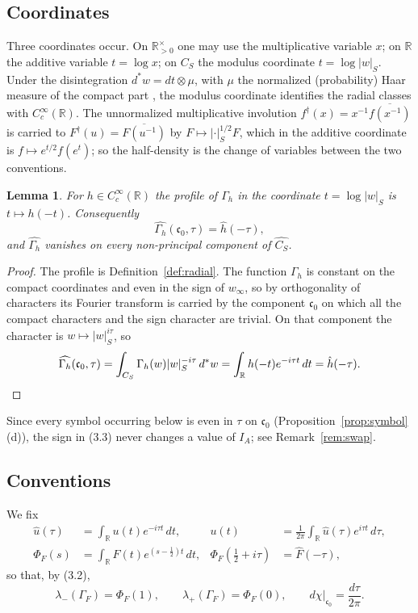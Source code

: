 \documentclass[11pt]{amsart}
\newtheorem{lemma}[theorem]{Lemma}
\theoremstyle{definition}
\theoremstyle{remark}
\newcommand{\R}{\mathbb R}
\newcommand{\CS}{C_S}
\newcommand{\cz}{\mathfrak c_0}
\begin{document}
\subsection{Coordinates}

Three coordinates occur.  On $\R_{>0}^\times$ one may use the multiplicative
variable $x$; on $\R$ the additive variable $t=\log x$; on $\CS$ the modulus
coordinate $t=\log|w|_S$.  Under the disintegration $d^*w=dt\otimes\mu$, with
$\mu$ the normalized (probability) Haar measure of the compact part
\cite[(10)]{P43}, the modulus coordinate identifies the
radial classes with $C_c^\infty(\R)$.  The unnormalized multiplicative
involution $f^\dagger(x)=x^{-1}\overline{f(x^{-1})}$ is carried to
$F^\dagger(u)=\overline{F(u^{-1})}$ by $F\mapsto|\cdot|_S^{1/2}F$, which in the
additive coordinate is $f\mapsto e^{t/2}f(e^t)$; so the half-density is the
change of variables between the two conventions.

\begin{lemma}
\label{lem:profile}
For $h\in C_c^\infty(\R)$ the profile of $\Gamma_h$ in the coordinate
$t=\log|w|_S$ is $t\mapsto h(-t)$.  Consequently
\[
  \widehat{\Gamma_h}(\cz,\tau)=\hat h(-\tau),
  \tag{3.3}
\]
and $\widehat{\Gamma_h}$ vanishes on every non-principal component of
$\widehat{\CS}$.
\end{lemma}

\begin{proof}
The profile is Definition~\ref{def:radial}.  The function $\Gamma_h$ is
constant on the compact coordinates and even in the sign of $w_\infty$, so by
orthogonality of characters its Fourier transform is carried by the component
$\cz$ on which all the compact characters and the sign character are trivial.
On that component the character is $w\mapsto|w|_S^{i\tau}$, so
\[
  \widehat{\Gamma_h}(\cz,\tau)=\int_{\CS}\Gamma_h(w)|w|_S^{-i\tau}\,d^*w
  =\int_\R h(-t)e^{-i\tau t}\,dt=\hat h(-\tau).\qedhere
\]
\end{proof}

Since every symbol occurring below is even in $\tau$ on $\cz$
(Proposition~\ref{prop:symbol}(d)), the sign in (3.3) never changes a value of
$I_A$; see Remark~\ref{rem:swap}.

\subsection{Conventions}

We fix
\begin{equation}
\begin{aligned}
  \hat u(\tau)&=\int_\R u(t)e^{-i\tau t}\,dt,
  &u(t)&=\frac1{2\pi}\int_\R\hat u(\tau)e^{i\tau t}\,d\tau,\\
  \Phi_F(s)&=\int_\R F(t)e^{(s-\frac12)t}\,dt,
  &\Phi_F(\tfrac12+i\tau)&=\hat F(-\tau),
\end{aligned}
\tag{3.4}
\end{equation}
so that, by (3.2),
\begin{equation}
  \lambda_-(\Gamma_F)=\Phi_F(1),\qquad \lambda_+(\Gamma_F)=\Phi_F(0),
  \qquad d\chi|_{\cz}=\frac{d\tau}{2\pi}.
\tag{3.5}
\end{equation}
\end{document}
